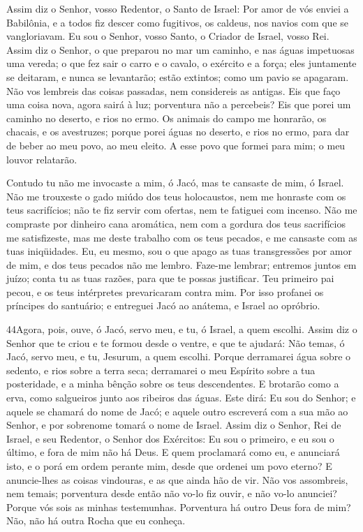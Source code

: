 Assim diz o Senhor, vosso Redentor, o Santo de Israel: Por amor
de vós enviei a Babilônia, e a todos fiz descer como fugitivos, os
caldeus, nos navios com que se vangloriavam. Eu sou o Senhor,
vosso Santo, o Criador de Israel, vosso Rei. Assim diz o
Senhor, o que preparou no mar um caminho, e nas águas impetuosas uma
vereda; o que fez sair o carro e o cavalo, o exército e a
força; eles juntamente se deitaram, e nunca se levantarão; estão
extintos; como um pavio se apagaram. Não vos lembreis das
coisas passadas, nem considereis as antigas. Eis que faço uma
coisa nova, agora sairá à luz; porventura não a percebeis? Eis que
porei um caminho no deserto, e rios no ermo. Os animais do
campo me honrarão, os chacais, e os avestruzes; porque porei águas
no deserto, e rios no ermo, para dar de beber ao meu povo, ao meu
eleito.
 A esse povo que formei para mim; o meu louvor relatarão.

Contudo tu não me invocaste a mim, ó Jacó, mas te cansaste de
mim, ó Israel. Não me trouxeste o gado miúdo dos teus
holocaustos, nem me honraste com os teus sacrifícios; não te fiz
servir com ofertas, nem te fatiguei com incenso. Não me
compraste por dinheiro cana aromática, nem com a gordura dos teus
sacrifícios me satisfizeste, mas me deste trabalho com os teus
pecados, e me cansaste com as tuas iniqüidades. Eu, eu mesmo,
sou o que apago as tuas transgressões por amor de mim, e dos teus
pecados não me lembro. Faze-me lembrar; entremos juntos em
juízo; conta tu as tuas razões, para que te possas justificar.
Teu primeiro pai pecou, e os teus intérpretes prevaricaram
contra mim. Por isso profanei os príncipes do santuário; e
entreguei Jacó ao anátema, e Israel ao opróbrio.

\medskip

\lettrine{44}{}Agora, pois, ouve, ó Jacó, servo meu, e tu, ó
Israel, a quem escolhi. Assim diz o Senhor que te criou e te
formou desde o ventre, e que te ajudará: Não temas, ó Jacó, servo
meu, e tu, Jesurum, a quem escolhi. Porque derramarei água sobre
o sedento, e rios sobre a terra seca; derramarei o meu Espírito
sobre a tua posteridade, e a minha bênção sobre os teus
descendentes. E brotarão como a erva, como salgueiros junto aos
ribeiros das águas. Este dirá: Eu sou do Senhor; e aquele se
chamará do nome de Jacó; e aquele outro escreverá com a sua mão ao
Senhor, e por sobrenome tomará o nome de Israel. Assim diz o
Senhor, Rei de Israel, e seu Redentor, o Senhor dos Exércitos: Eu
sou o primeiro, e eu sou o último, e fora de mim não há Deus. E
quem proclamará como eu, e anunciará isto, e o porá em ordem perante
mim, desde que ordenei um povo eterno? E anuncie-lhes as coisas
vindouras, e as que ainda hão de vir. Não vos assombreis, nem
temais; porventura desde então não vo-lo fiz ouvir, e não vo-lo
anunciei? Porque vós sois as minhas testemunhas. Porventura há outro
Deus fora de mim? Não, não há outra Rocha que eu conheça.

